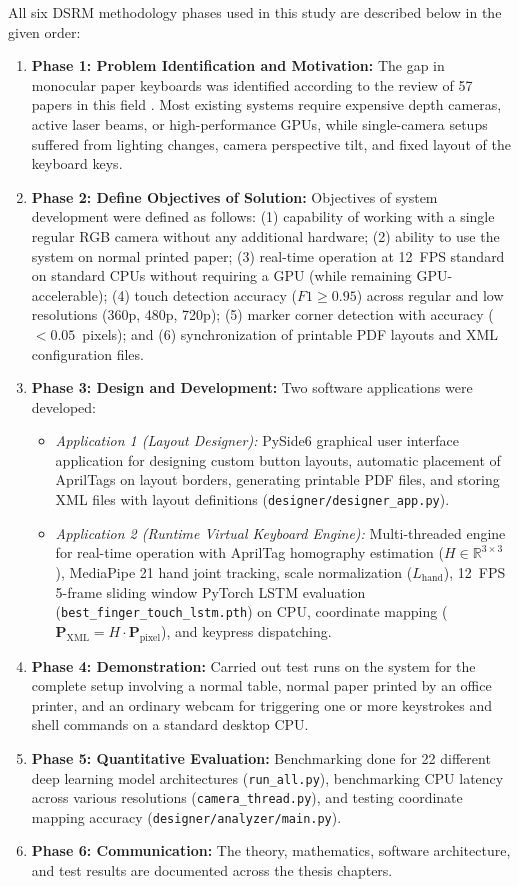 All six DSRM methodology phases used in this study are described below in the given order:
\begin{enumerate}
    \item \textbf{Phase 1: Problem Identification and Motivation:} The gap in monocular paper keyboards was identified according to the review of 57 papers in this field \cite{ReviewVirtualKeyboard2020, Thomas2013Camera, Maman2023TypeNet}. Most existing systems require expensive depth cameras, active laser beams, or high-performance GPUs, while single-camera setups suffered from lighting changes, camera perspective tilt, and fixed layout of the keyboard keys.
    \item \textbf{Phase 2: Define Objectives of Solution:} Objectives of system development were defined as follows: (1) capability of working with a single regular RGB camera without any additional hardware; (2) ability to use the system on normal printed paper; (3) real-time operation at 12~FPS standard on standard CPUs without requiring a GPU (while remaining GPU-accelerable); (4) touch detection accuracy ($F1 \ge 0.95$) across regular and low resolutions (360p, 480p, 720p); (5) marker corner detection with accuracy ($< 0.05$~pixels); and (6) synchronization of printable PDF layouts and XML configuration files.
    \item \textbf{Phase 3: Design and Development:} Two software applications were developed:
    \begin{itemize}
        \item \emph{Application 1 (Layout Designer):} PySide6 graphical user interface application for designing custom button layouts, automatic placement of AprilTags on layout borders, generating printable PDF files, and storing XML files with layout definitions (\texttt{designer/designer\_app.py}).
        \item \emph{Application 2 (Runtime Virtual Keyboard Engine):} Multi-threaded engine for real-time operation with AprilTag homography estimation ($H \in \mathbb{R}^{3 \times 3}$), MediaPipe 21 hand joint tracking, scale normalization ($L_{\text{hand}}$), 12~FPS 5-frame sliding window PyTorch LSTM evaluation (\texttt{best\_finger\_touch\_lstm.pth}) on CPU, coordinate mapping ($\mathbf{P}_{\text{XML}} = H \cdot \mathbf{P}_{\text{pixel}}$), and keypress dispatching.
    \end{itemize}
    \item \textbf{Phase 4: Demonstration:} Carried out test runs on the system for the complete setup involving a normal table, normal paper printed by an office printer, and an ordinary webcam for triggering one or more keystrokes and shell commands on a standard desktop CPU.
    \item \textbf{Phase 5: Quantitative Evaluation:} Benchmarking done for 22 different deep learning model architectures (\texttt{run\_all.py}), benchmarking CPU latency across various resolutions (\texttt{camera\_thread.py}), and testing coordinate mapping accuracy (\texttt{designer/analyzer/main.py}).
    \item \textbf{Phase 6: Communication:} The theory, mathematics, software architecture, and test results are documented across the thesis chapters.
\end{enumerate}

